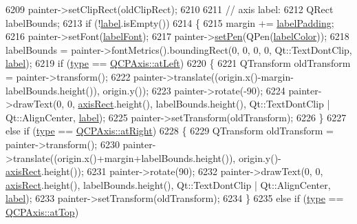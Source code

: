 \begin{DoxyCode}
6209     painter->setClipRect(oldClipRect);
6210   
6211   \textcolor{comment}{// axis label:}
6212   QRect labelBounds;
6213   \textcolor{keywordflow}{if} (!\hyperlink{class_q_c_p_axis_painter_private_afe004c322f92543c0467afc02da6cf6d}{label}.isEmpty())
6214   \{
6215     margin += \hyperlink{class_q_c_p_axis_painter_private_a3f7465372df132bf7814345ea697dd34}{labelPadding};
6216     painter->setFont(\hyperlink{class_q_c_p_axis_painter_private_add1ff1030fbc36112c19b1468ad82d55}{labelFont});
6217     painter->\hyperlink{class_q_c_p_painter_af9c7a4cd1791403901f8c5b82a150195}{setPen}(QPen(\hyperlink{class_q_c_p_axis_painter_private_a5c36467daf057da0cf0792f3c5a06089}{labelColor}));
6218     labelBounds = painter->fontMetrics().boundingRect(0, 0, 0, 0, Qt::TextDontClip, 
      \hyperlink{class_q_c_p_axis_painter_private_afe004c322f92543c0467afc02da6cf6d}{label});
6219     \textcolor{keywordflow}{if} (\hyperlink{class_q_c_p_axis_painter_private_ae04594e97417336933d807c86d353098}{type} == \hyperlink{class_q_c_p_axis_ae2bcc1728b382f10f064612b368bc18aaf84aa6cac6fb6099f54a2cbf7546b730}{QCPAxis::atLeft})
6220     \{
6221       QTransform oldTransform = painter->transform();
6222       painter->translate((origin.x()-margin-labelBounds.height()), origin.y());
6223       painter->rotate(-90);
6224       painter->drawText(0, 0, \hyperlink{class_q_c_p_axis_painter_private_afcd55b0e1ecd689fffd2b1fc75dc7732}{axisRect}.height(), labelBounds.height(), Qt::TextDontClip | 
      Qt::AlignCenter, \hyperlink{class_q_c_p_axis_painter_private_afe004c322f92543c0467afc02da6cf6d}{label});
6225       painter->setTransform(oldTransform);
6226     \}
6227     \textcolor{keywordflow}{else} \textcolor{keywordflow}{if} (\hyperlink{class_q_c_p_axis_painter_private_ae04594e97417336933d807c86d353098}{type} == \hyperlink{class_q_c_p_axis_ae2bcc1728b382f10f064612b368bc18aadf5509f7d29199ef2f263b1dd224b345}{QCPAxis::atRight})
6228     \{
6229       QTransform oldTransform = painter->transform();
6230       painter->translate((origin.x()+margin+labelBounds.height()), origin.y()-
      \hyperlink{class_q_c_p_axis_painter_private_afcd55b0e1ecd689fffd2b1fc75dc7732}{axisRect}.height());
6231       painter->rotate(90);
6232       painter->drawText(0, 0, \hyperlink{class_q_c_p_axis_painter_private_afcd55b0e1ecd689fffd2b1fc75dc7732}{axisRect}.height(), labelBounds.height(), Qt::TextDontClip | 
      Qt::AlignCenter, \hyperlink{class_q_c_p_axis_painter_private_afe004c322f92543c0467afc02da6cf6d}{label});
6233       painter->setTransform(oldTransform);
6234     \}
6235     \textcolor{keywordflow}{else} \textcolor{keywordflow}{if} (\hyperlink{class_q_c_p_axis_painter_private_ae04594e97417336933d807c86d353098}{type} == \hyperlink{class_q_c_p_axis_ae2bcc1728b382f10f064612b368bc18aac0ece2b680d3f545e701f75af1655977}{QCPAxis::atTop})

\end{DoxyCode}
